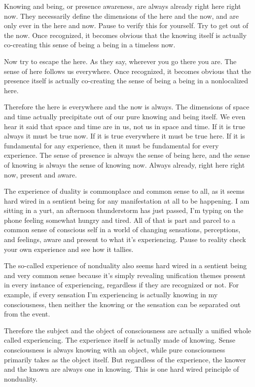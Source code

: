 \documentclass[12pt,openany]{book}
\begin{document}
Knowing and being, or presence awareness, are always already right here right now. They necessarily define the dimensions of the here and the now, and are only ever in the here and now. Pause to verify this for yourself. Try to get out of the now. Once recognized, it becomes obvious that the knowing itself is actually co-creating this sense of being a being in a timeless now.

Now try to escape the here. As they say, wherever you go there you are. The sense of here follows us everywhere. Once recognized, it becomes obvious that the presence itself is actually co-creating the sense of being a being in a nonlocalized here.

Therefore the here is everywhere and the now is always. The dimensions of space and time actually precipitate out of our pure knowing and being itself. We even hear it said that space and time are in us, not us in space and time. If it is true always it must be true now. If it is true everywhere it must be true here. If it is fundamental for any experience, then it must be fundamental for every experience. The sense of presence is always the sense of being here, and the sense of knowing is always the sense of knowing now. Always already, right here right now, present and aware.

The experience of duality is commonplace and common sense to all, as it seems hard wired in a sentient being for any manifestation at all to be happening. I am sitting in a yurt, an afternoon thunderstorm has just passed, I'm typing on the phone feeling somewhat hungry and tired. All of that is part and parcel to a common sense of conscious self in a world of changing sensations, perceptions, and feelings, aware and present to what it's experiencing. Pause to reality check your own experience and see how it tallies.

The so-called experience of nonduality also seems hard wired in a sentient being and very common sense because it's simply revealing unification themes present in every instance of experiencing, regardless if they are recognized or not. For example, if every sensation I'm experiencing is actually knowing in my consciousness, then neither the knowing or the sensation can be separated out from the event.

Therefore the subject and the object of consciousness are actually a unified whole called experiencing. The experience itself is actually made of knowing. Sense consciousness is always knowing with an object, while pure consciousness primarily takes as the object itself. But regardless of the experience, the knower and the known are always one in knowing. This is one hard wired principle of nonduality.
\end{document}
